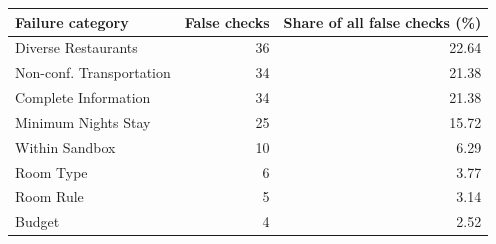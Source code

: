 \begin{tabular}{@{}lrr@{}}
\toprule
Failure category & False checks & Share of all false checks (\%) \\
\midrule
Diverse Restaurants & 36 & 22.64 \\
Non-conf. Transportation & 34 & 21.38 \\
Complete Information & 34 & 21.38 \\
Minimum Nights Stay & 25 & 15.72 \\
Within Sandbox & 10 & 6.29 \\
Room Type & 6 & 3.77 \\
Room Rule & 5 & 3.14 \\
Budget & 4 & 2.52 \\
\bottomrule
\end{tabular}
